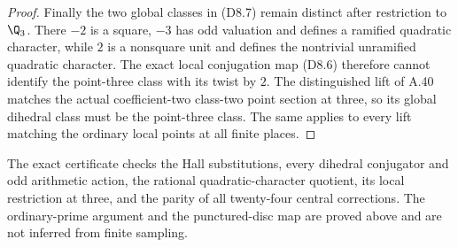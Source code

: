 \begin{proof}
Finally the two global classes in (D8.7) remain
distinct after restriction to \(\Q_3\).  There
\(-2\) is a square, \(-3\) has odd valuation and
defines a ramified quadratic character, while
\(2\) is a nonsquare unit and defines the
nontrivial unramified quadratic character.
The exact local conjugation map (D8.6) therefore
cannot identify the point-three class with its
twist by \(2\).  The distinguished lift of A.40
matches the actual coefficient-two class-two point
section at three, so its global dihedral class
must be the point-three class.  The same applies
to every lift matching the ordinary local points
at all finite places.
\end{proof}

The exact certificate
checks the Hall substitutions, every dihedral
conjugator and odd arithmetic action, the rational
quadratic-character quotient, its local restriction
at three, and the parity of all twenty-four
central corrections.  The ordinary-prime
argument and the punctured-disc map are proved
above and are not inferred from finite sampling.
